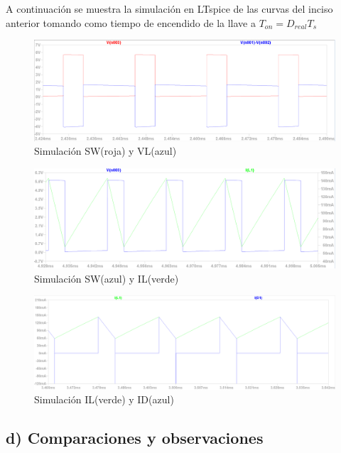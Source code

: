 \documentclass[e4_tp1_main.tex]{subfiles}
\begin{document}
A continuaci\'on se muestra la simulaci\'on en LTspice de las curvas del inciso anterior tomando como tiempo de encendido de la llave a $T_{on}=D_{real}T_s$


\begin{figure}[H]
  \centering
    \includegraphics[scale = 0.6]{Imagenes/punto2/SW&VL}
  \caption{Simulaci\'on SW(roja) y VL(azul)}
  \label{fig:SW&VL}
\end{figure}

\begin{figure}[H]
  \centering
    \includegraphics[scale = 0.6]{Imagenes/punto2/SW&IL}
  \caption{Simulaci\'on SW(azul) y IL(verde)}
  \label{fig:SW&IL}
\end{figure}


\begin{figure}[H]
  \centering
    \includegraphics[scale = 0.52]{Imagenes/punto2/IL&ID}
  \caption{Simulaci\'on IL(verde) y ID(azul)}
  \label{fig:IL&ID}
\end{figure}


\subsection*{d) Comparaciones y observaciones}
\end{document}

